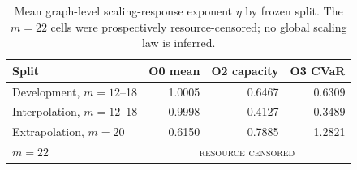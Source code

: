 
\begin{table}[t]
\centering
\caption{Mean graph-level scaling-response exponent $\eta$ by frozen split. The $m=22$ cells were prospectively resource-censored; no global scaling law is inferred.}
\label{tab:scaling-summary}
\small
\begin{tabular}{@{}lrrr@{}}
\toprule
Split & O0 mean & O2 capacity & O3 CVaR \\
\midrule
Development, $m=12$--18 & 1.0005 & 0.6467 & 0.6309 \\
Interpolation, $m=12$--18 & 0.9998 & 0.4127 & 0.3489 \\
Extrapolation, $m=20$ & 0.6150 & 0.7885 & 1.2821 \\
$m=22$ & \multicolumn{3}{c}{\textsc{resource censored}} \\
\bottomrule
\end{tabular}
\end{table}
